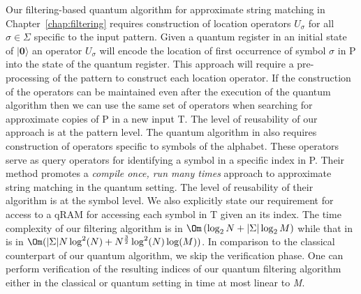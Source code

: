 Our filtering-based quantum algorithm for approximate string matching in Chapter~\ref{chap:filtering} requires construction of location operators $U_{\sigma}$ for all $\sigma \in \Sigma$ specific to the input pattern. Given a quantum register in an initial state of $\vert \mathbf{0} \rangle$ an operator $U_{\sigma}$ will encode the location of first occurrence of symbol $\sigma$ in P into the state of the quantum register. This approach will require a pre-processing of the pattern to construct each location operator. If the construction of the operators can be maintained even after the execution of the quantum algorithm then we can use the same set of operators when searching for approximate copies of P in a new input T. The level of reusability of our approach is at the pattern level. The quantum algorithm in \cite{Mateus2006} also requires construction of operators specific to symbols of the alphabet. These operators serve as query operators for identifying a symbol in a specific index in P. Their method promotes a \textit{compile once, run many times} approach to approximate string matching in the quantum setting. The level of reusability of their algorithm is at the symbol level. We also explicitly state our requirement for access to a qRAM for accessing each symbol in T given an its index. The time complexity of our filtering algorithm is in $\Om\left( \log_2 N + \vert \Sigma \vert\log_2 M \right)$ while that in \cite{Mateus2006} is in $\Om(\vert \Sigma \vert N\log^2(N) + N^{\frac{3}{2}}\log^2(N)\log(M))$. In comparison to the classical counterpart of our quantum algorithm, we skip the verification phase. One can perform verification of the resulting indices of our quantum filtering algorithm either in the classical or quantum setting in time at most linear to \textit{M}. 

